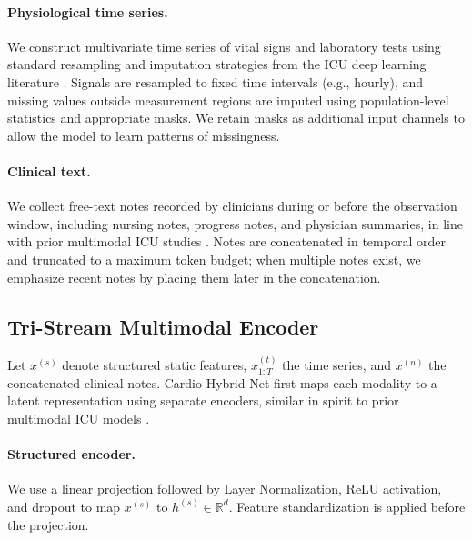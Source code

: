 \documentclass{article}
\begin{document}
\paragraph{Physiological time series.}
We construct multivariate time series of vital signs and laboratory tests using standard resampling and imputation strategies from the ICU deep learning literature \cite{Khadanga2019ICUNotes,Shukla2020IntegratingTSNotes,King2023MultimodalPretrain}.
Signals are resampled to fixed time intervals (e.g., hourly), and missing values outside measurement regions are imputed using population-level statistics and appropriate masks.
We retain masks as additional input channels to allow the model to learn patterns of missingness.

\paragraph{Clinical text.}
We collect free-text notes recorded by clinicians during or before the observation window, including nursing notes, progress notes, and physician summaries, in line with prior multimodal ICU studies \cite{Deznabi2021MortalityNotes,Lyu2023MultimodalTransformer,Vagliano2023SystematicTextMortality}.
Notes are concatenated in temporal order and truncated to a maximum token budget; when multiple notes exist, we emphasize recent notes by placing them later in the concatenation.

\subsection{Tri-Stream Multimodal Encoder}

Let $x^{(s)}$ denote structured static features, $x^{(t)}_{1:T}$ the time series, and $x^{(n)}$ the concatenated clinical notes.
Cardio-Hybrid Net first maps each modality to a latent representation using separate encoders, similar in spirit to prior multimodal ICU models \cite{Shukla2020IntegratingTSNotes,Lyu2023MultimodalTransformer}.

\paragraph{Structured encoder.}
We use a linear projection followed by Layer Normalization, ReLU activation, and dropout to map $x^{(s)}$ to $h^{(s)} \in \mathbb{R}^{d}$. Feature standardization is applied before the projection.
\end{document}
